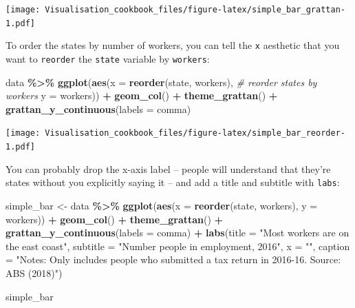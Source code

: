 \documentclass[
]{book}
\newenvironment{Shaded}{\begin{snugshade}}{\end{snugshade}}
\newcommand{\CommentTok}[1]{\textcolor[rgb]{0.56,0.35,0.01}{\textit{#1}}}
\newcommand{\DataTypeTok}[1]{\textcolor[rgb]{0.13,0.29,0.53}{#1}}
\newcommand{\KeywordTok}[1]{\textcolor[rgb]{0.13,0.29,0.53}{\textbf{#1}}}
\newcommand{\NormalTok}[1]{#1}
\newcommand{\OperatorTok}[1]{\textcolor[rgb]{0.81,0.36,0.00}{\textbf{#1}}}
\newcommand{\StringTok}[1]{\textcolor[rgb]{0.31,0.60,0.02}{#1}}
\begin{document}
\texttt{[image: Visualisation\_cookbook\_files/figure-latex/simple\_bar\_grattan-1.pdf]}

To order the states by number of workers, you can tell the \texttt{x} aesthetic that you want to \texttt{reorder} the \texttt{state} variable by \texttt{workers}:

\begin{Shaded}
\begin{Highlighting}[]
\NormalTok{data }\OperatorTok{\%\textgreater{}\%}\StringTok{ }
\StringTok{  }\KeywordTok{ggplot}\NormalTok{(}\KeywordTok{aes}\NormalTok{(}\DataTypeTok{x =} \KeywordTok{reorder}\NormalTok{(state, workers), }\CommentTok{\# reorder states by workers}
             \DataTypeTok{y =}\NormalTok{ workers)) }\OperatorTok{+}\StringTok{ }
\StringTok{  }\KeywordTok{geom\_col}\NormalTok{() }\OperatorTok{+}\StringTok{ }
\StringTok{  }\KeywordTok{theme\_grattan}\NormalTok{() }\OperatorTok{+}\StringTok{ }
\StringTok{  }\KeywordTok{grattan\_y\_continuous}\NormalTok{(}\DataTypeTok{labels =}\NormalTok{ comma)}
\end{Highlighting}
\end{Shaded}

\texttt{[image: Visualisation\_cookbook\_files/figure-latex/simple\_bar\_reorder-1.pdf]}

You can probably drop the x-axis label -- people will understand that they're states without you explicitly saying it -- and add a title and subtitle with \texttt{labs}:

\begin{Shaded}
\begin{Highlighting}[]
\NormalTok{simple\_bar \textless{}{-}}\StringTok{ }\NormalTok{data }\OperatorTok{\%\textgreater{}\%}\StringTok{ }
\StringTok{  }\KeywordTok{ggplot}\NormalTok{(}\KeywordTok{aes}\NormalTok{(}\DataTypeTok{x =} \KeywordTok{reorder}\NormalTok{(state, workers),}
             \DataTypeTok{y =}\NormalTok{ workers)) }\OperatorTok{+}\StringTok{ }
\StringTok{  }\KeywordTok{geom\_col}\NormalTok{() }\OperatorTok{+}\StringTok{ }
\StringTok{  }\KeywordTok{theme\_grattan}\NormalTok{() }\OperatorTok{+}\StringTok{ }
\StringTok{  }\KeywordTok{grattan\_y\_continuous}\NormalTok{(}\DataTypeTok{labels =}\NormalTok{ comma) }\OperatorTok{+}\StringTok{ }
\StringTok{  }\KeywordTok{labs}\NormalTok{(}\DataTypeTok{title =} \StringTok{"Most workers are on the east coast"}\NormalTok{,}
       \DataTypeTok{subtitle =} \StringTok{"Number people in employment, 2016"}\NormalTok{,}
       \DataTypeTok{x =} \StringTok{""}\NormalTok{,}
       \DataTypeTok{caption =} \StringTok{"Notes: Only includes people who submitted a tax return in 2016{-}16. Source: ABS (2018)"}\NormalTok{)}

\NormalTok{simple\_bar}
\end{Highlighting}
\end{Shaded}
\end{document}
